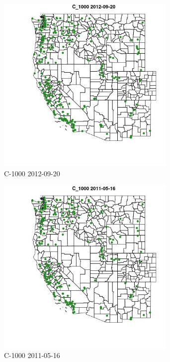 \begin{figure} 
\centering  
\includegraphics[width=0.77\textwidth]{Code_Outputs/ML_input_report_ML_input_PM25_Step5_part_d_de_duplicated_aves_ML_input_MapObsC_10002012-09-20.jpg} 
\caption{\label{fig:ML_input_report_ML_input_PM25_Step5_part_d_de_duplicated_aves_ML_inputMapObsC_10002012-09-20}C-1000 2012-09-20} 
\end{figure} 
 

\clearpage 

\begin{figure} 
\centering  
\includegraphics[width=0.77\textwidth]{Code_Outputs/ML_input_report_ML_input_PM25_Step5_part_d_de_duplicated_aves_ML_input_MapObsC_10002011-05-16.jpg} 
\caption{\label{fig:ML_input_report_ML_input_PM25_Step5_part_d_de_duplicated_aves_ML_inputMapObsC_10002011-05-16}C-1000 2011-05-16} 
\end{figure} 
 

